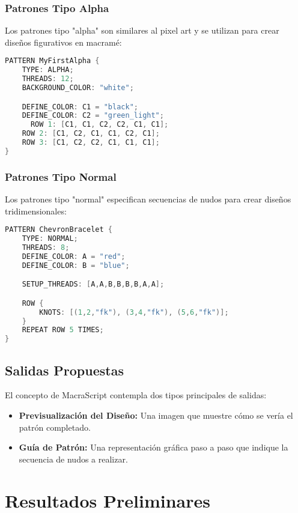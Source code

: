 \documentclass[12pt,a4paper]{report}
\begin{document}
\subsection{Patrones Tipo Alpha}
Los patrones tipo "alpha" son similares al pixel art y se utilizan para crear diseños figurativos en macramé:

\begin{lstlisting}[language=C++, caption=Ejemplo de patrón tipo Alpha, frame=single]
PATTERN MyFirstAlpha {
    TYPE: ALPHA;
    THREADS: 12;
    BACKGROUND_COLOR: "white";

    DEFINE_COLOR: C1 = "black";
    DEFINE_COLOR: C2 = "green_light";
      ROW 1: [C1, C1, C2, C2, C1, C1];
    ROW 2: [C1, C2, C1, C1, C2, C1];
    ROW 3: [C1, C2, C2, C1, C1, C1];
}
\end{lstlisting}

\subsection{Patrones Tipo Normal}
Los patrones tipo "normal" especifican secuencias de nudos para crear diseños tridimensionales:

\begin{lstlisting}[language=C++, caption=Ejemplo de patrón tipo Normal, frame=single]
PATTERN ChevronBracelet {
    TYPE: NORMAL;
    THREADS: 8;
    DEFINE_COLOR: A = "red";
    DEFINE_COLOR: B = "blue";

    SETUP_THREADS: [A,A,B,B,B,B,A,A];

    ROW {
        KNOTS: [(1,2,"fk"), (3,4,"fk"), (5,6,"fk")];
    }
    REPEAT ROW 5 TIMES;
}
\end{lstlisting}

\section{Salidas Propuestas}
El concepto de MacraScript contempla dos tipos principales de salidas:

\begin{itemize}
    \item \textbf{Previsualización del Diseño:} Una imagen que muestre cómo se vería el patrón completado.
    \item \textbf{Guía de Patrón:} Una representación gráfica paso a paso que indique la secuencia de nudos a realizar.
\end{itemize}

\chapter{Resultados Preliminares}
\end{document}
